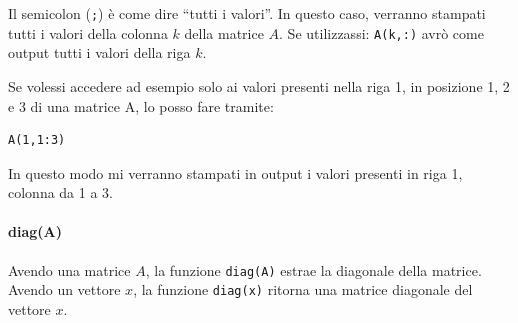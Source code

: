 Il semicolon (\verb|;|) è come dire ``tutti i valori''. In questo caso, verranno stampati tutti i valori della colonna $ k $ della matrice $ A $.
Se utilizzassi: \verb|A(k,:)| avrò come output tutti i valori della riga $ k $.

Se volessi accedere ad esempio solo ai valori presenti nella riga 1, in posizione 1, 2 e 3 di una matrice A, lo posso fare tramite:
\begin{verbatim}
A(1,1:3)
\end{verbatim}
In questo modo mi verranno stampati in output i valori presenti in riga 1, colonna da 1 a 3.

%
\paragraph{diag(A)} Avendo una matrice $ A $, la funzione \verb|diag(A)| estrae la diagonale della matrice.
Avendo un vettore $ x $, la funzione \verb|diag(x)| ritorna una matrice diagonale del vettore $ x $.

